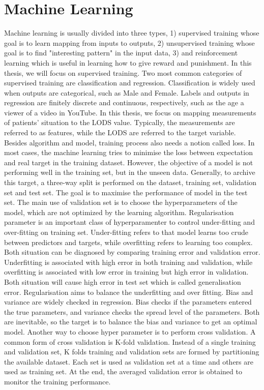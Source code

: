 \documentclass[12pt,a4paper,english
]{tunithesis}
\begin{document}
\section{Machine Learning}
Machine learning is usually divided into three types, 1) supervised training whose goal is to learn mapping from inputs to outputs, 2) unsupervised training whose goal is to find "interesting pattern" in the input data, 3) and reinforcement learning which is useful in learning how to give reward and punishment. In this thesis, we will focus on supervised training. Two most common categories of supervised training are classification and regression. Classification is widely used when outputs are categorical, such as Male and Female. Labels and outputs in regression are finitely discrete and continuous, respectively, such as the age a viewer of a video in YouTube. In this thesis, we focus on mapping measurements of patients’ situation to the LODS value. Typically, the measurements are referred to as features, while the LODS are referred to the target variable. Besides algorithm and model, training process also needs a notion called loss. In most cases, the machine learning tries to minimise the loss between expectation and real target in the training dataset. However, the objective of a model is not performing well in the training set, but in the unseen data. Generally, to archive this target, a three-way split is performed on the dataset, training set, validation set and test set. The goal is to maximise the performance of model in the test set. The main use of validation set is to choose the hyperparameters of the model, which are not optimized by the learning algorithm. Regularisation parameter is an important class of hyperparamenter to control under-fitting and over-fitting on training set. Under-fitting refers to that model learns too crude between predictors and targets, while overfitting refers to learning too complex. Both situation can be diagnosed by comparing training error and validation error. Underfitting is associated with high error in both training and validation, while overfitting is associated with low error in training but high error in validation. Both situation will cause high error in test set which is called generalisation error. Regularisation aims to balance the underfitting and over fitting. Bias and variance are widely checked in regression. Bias checks if the parameters entered the true parameters, and variance checks the spread level of the parameters. Both are inevitable, so the target is to balance the bias and variance to get an optimal model.
Another way to choose hyper parameter is to perform cross validation. A common form of cross validation is K-fold validation. Instead of a single training and validation set, K folds training and validation sets are formed by partitioning the available dataset. Each set is used as validation set at a time and others are used as training set. At the end, the averaged validation error is obtained to monitor the training performance. 
\end{document}
